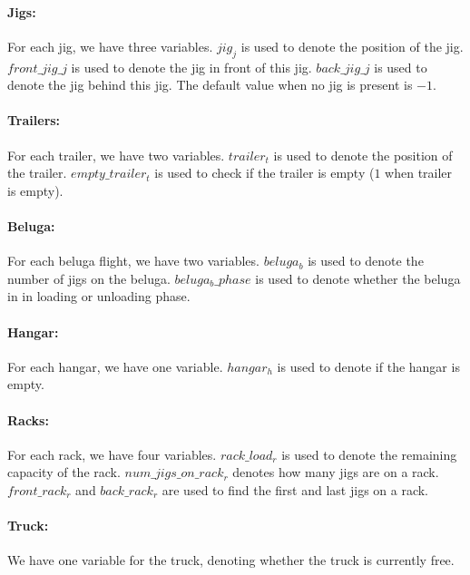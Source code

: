 \documentclass{article}
\begin{document}
\paragraph*{Jigs:} For each jig, we have three variables. $jig_j$ is used to denote the position of the jig. 
$front\_jig\_j$ is used to denote the jig in front of this jig. $back\_jig\_j$ is used to denote the jig behind this jig. The default value when no jig is present is $-1$.\\

\paragraph*{Trailers:} For each trailer, we have two variables. $trailer_t$ is used to denote the position of the trailer. 
$empty\_trailer_t$ is used to check if the trailer is empty ($1$ when trailer is empty). \\

\paragraph*{Beluga:} For each beluga flight, we have two variables. $beluga_b$ is used to denote the number of jigs on the beluga. 
$beluga_b\_phase$ is used to denote whether the beluga in in loading or unloading phase.\\

\paragraph*{Hangar:} For each hangar, we have one variable. $hangar_h$ is used to denote if the hangar is empty.\\

\paragraph*{Racks:} For each rack, we have four variables. $rack\_load_r$ is used to denote the remaining capacity of the rack. $num\_jigs\_on\_rack_r$ denotes how many jigs are on a rack. 
$front\_rack_r$ and $back\_rack_r$ are used to find the first and last jigs on a rack.\\

\paragraph*{Truck:} We have one variable for the truck, denoting whether the truck is currently free.\\
\end{document}
